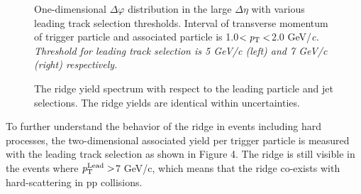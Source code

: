 \begin{figure}
	\centering
	\caption{ One-dimensional $\Delta\varphi$ distribution in the large $\Delta\eta$ with various leading track selection thresholds. Interval of transverse momentum of trigger particle and associated particle is 1.0$<\it{p}_{\rm{T}}<$2.0 GeV/\it{c}\rm{}. Threshold for leading track selection is 5 GeV/\it{c}\rm{} (left) and 7 GeV/\it{c}\rm{} (right) respectively. }
\end{figure}


\begin{figure}
	\centering
	\caption{ The ridge yield spectrum with respect to the leading particle and jet selections. The ridge yields are identical within uncertainties.}
\end{figure}

To further understand the behavior of the ridge in events including hard processes, the two-dimensional associated yield per trigger particle is measured with the leading track selection as shown in Figure 4. The ridge is still visible in the events where $\it{p}_{\rm{T}}^{\rm{Lead}}>$7 GeV/c, which means that the ridge co-exists with hard-scattering in pp collisions. 

